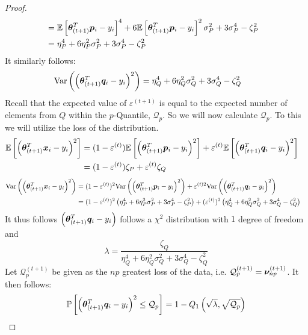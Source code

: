 \documentclass{article} %
\begin{document}
\begin{appendices}
\begin{proof}
\begin{align*}
			&= \mathbb{E}\left[{\bm{\theta}}_{(t+1)}^T{\bm{p}}_i - y_i\right]^4 + 6 \mathbb{E}\left[{\bm{\theta}}_{(t+1)}^T{\bm{p}}_i - y_i\right]^2\sigma_P^2 + 3\sigma_P^4 - \zeta_P^2&&\\
			&= \eta_P^4 + 6 \eta_P^2 \sigma_P^2 + 3\sigma_P^4 - \zeta_P^2 &&
		\end{align*}
		It similarly follows:
		\begin{align*}
			\mathrm{Var}\left(\left({\bm{\theta}}_{(t+1)}^T{\bm{q}}_i - y_i\right)^2\right)&=\eta_Q^4 + 6 \eta_Q^2 \sigma_Q^2 + 3\sigma_Q^4 - \zeta_Q^2 &&
		\end{align*}
		Recall that the expected value of $\varepsilon^{(t+1)}$ is equal to the expected number of elements from $Q$ within the $p$-Quantile, $\mathcal{Q}_p$. So we will now calculate $\mathcal{Q}_p$. To this we will utilize the  loss of the distribution. 
		\begin{align*}
			\mathbb{E}\left[\left({\bm{\theta}}_{(t+1)}^T {\bm{x}}_i - y_i\right)^2\right] &= (1-\varepsilon^{(t)})\mathbb{E}\left[\left({\bm{\theta}}_{(t+1)}^T {\bm{p}}_i - y_i\right)^2\right] + \varepsilon^{(t)}\mathbb{E}\left[\left({\bm{\theta}}_{(t+1)}^T {\bm{q}}_i - y_i\right)^2\right] &&\\
			&= (1-\varepsilon^{(t)})\zeta_P + \varepsilon^{(t)}\zeta_Q &&
		\end{align*}
		\begin{align*}
			\mathrm{Var}\left(\left({\bm{\theta}}_{(t+1)}^T{\bm{x}}_i - y_i\right)^2\right) &= (1-\varepsilon^{(t)})^2\mathrm{Var}\left(\left({\bm{\theta}}_{(t+1)}^T{\bm{p}}_i - y_i\right)^2\right) + \varepsilon^{(t)2}\mathrm{Var}\left(\left({\bm{\theta}}_{(t+1)}^T{\bm{q}}_i - y_i\right)^2\right) &&\\
			&= (1-\varepsilon^{(t)})^2\left(\eta_P^4 + 6 \eta_P^2 \sigma_P^2 + 3\sigma_P^4 - \zeta_P^2\right) + (\varepsilon^{(t)})^2\left(\eta_Q^4 + 6 \eta_Q^2 \sigma_Q^2 + 3\sigma_Q^4 - \zeta_Q^2\right) &&
		\end{align*}
		It thus follows $\displaystyle \left({\bm{\theta}}_{(t+1)}^T{\bm{q}}_i - y_i\right)$ follows a $\chi^2$ distribution with $1$ degree of freedom and \begin{equation*} \lambda = \frac{\zeta_Q}{\eta_Q^4 + 6 \eta_Q^2 \sigma_Q^2 + 3\sigma_Q^4 - \zeta_Q^2}\end{equation*}
		Let $\mathcal{Q}_p^{(t+1)}$ be given as the $np$ greatest loss of the data, i.e. $\mathcal{Q}_p^{(t+1)} = {\bm{\nu}}_{np}^{(t+1)}$. It then follows:
		\begin{equation*}
			\mathbb{P}\left[\left({\bm{\theta}}^T_{(t+1)}{\bm{q}}_i -y_i\right)^2 \leq \mathcal{Q}_p\right] = 1 - Q_{1}\left(\sqrt{\lambda},\sqrt{\mathcal{Q}_p}\right)
		\end{equation*}

\end{proof}
\end{appendices}
\end{document}
